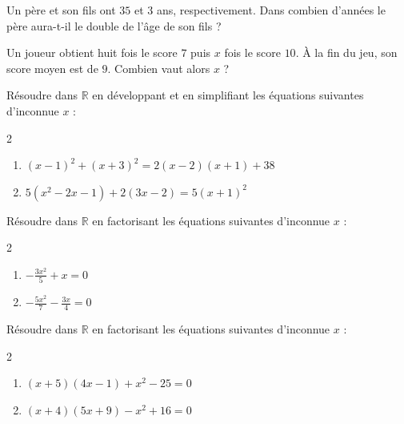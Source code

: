 \documentclass[main.tex]{subfiles}
\begin{document}
\begin{problem}\label{chapter07:problem:02} 
Un père et son fils ont $35$ et $3$ ans, respectivement. Dans combien d'années le père aura-t-il le double de l'âge de son fils ?
\end{problem}
\begin{problem}\label{chapter07:problem:03} 
Un joueur obtient huit fois le score $7$ puis $x$ fois le score $10$. À la fin du jeu, son score moyen est de $9$. Combien vaut alors $x$ ?

\end{problem}
\begin{problem}\label{chapter07:problem:04}  
Résoudre dans $\mathbb{R}$ en développant et en simplifiant les équations suivantes d'inconnue $x$ :\vspace{-0.5em}
\begin{multicols}{2}
\begin{enumerate}[label={$(E_\arabic*)$},leftmargin=*]
\item $(x-1)^2+(x+3)^2=2(x-2)(x+1)+38$
\item $5(x^2-2x-1)+2(3x-2)=5(x+1)^2$ 
\end{enumerate}
\end{multicols} 
\end{problem}
\begin{problem}\label{chapter07:problem:05} 
Résoudre dans $\mathbb{R}$ en factorisant   les équations suivantes d'inconnue $x$ :\vspace{-0.5em}
\begin{multicols}{2}
\begin{enumerate}[label={$(E_\arabic*)$},leftmargin=*]
\item $-\frac{3x^2}{5}+x=0$
\item $-\frac{5x^2}{7}-\frac{3x}{4}=0$ 
\end{enumerate}
\end{multicols} 
\end{problem}
\begin{problem}\label{chapter07:problem:06} 
Résoudre dans $\mathbb{R}$ en factorisant   les équations suivantes d'inconnue $x$ :\vspace{-0.5em}
\begin{multicols}{2}
\begin{enumerate}[label={$(E_\arabic*)$},leftmargin=*]
\item $(x+5)(4x-1)+x^2-25=0$
\item $(x+4)(5x+9)-x^2+16=0$ 
\end{enumerate}
\end{multicols} 
\end{problem}
\end{document}
